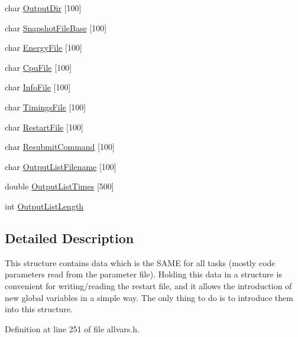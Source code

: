 \begin{DoxyCompactItemize}
\item 
char \hyperlink{structglobal__data__all__processes_aebda5d1b80cfb767b9668d7858c36bcc}{OutputDir} \mbox{[}100\mbox{]}
\item 
char \hyperlink{structglobal__data__all__processes_a4bcf5b5c31545691038015af9ae9acb3}{SnapshotFileBase} \mbox{[}100\mbox{]}
\item 
char \hyperlink{structglobal__data__all__processes_aa97394ab3a522c46b75f8b57a59ca0b5}{EnergyFile} \mbox{[}100\mbox{]}
\item 
char \hyperlink{structglobal__data__all__processes_ac2ba980c60460b89534ca8bba63cd679}{CpuFile} \mbox{[}100\mbox{]}
\item 
char \hyperlink{structglobal__data__all__processes_a3cbcdacb8b522288268993f0ce5b15ac}{InfoFile} \mbox{[}100\mbox{]}
\item 
char \hyperlink{structglobal__data__all__processes_ae0f7c691d211f8076374cc55271022e8}{TimingsFile} \mbox{[}100\mbox{]}
\item 
char \hyperlink{structglobal__data__all__processes_a67e197a37469217aa8ad32c42230b286}{RestartFile} \mbox{[}100\mbox{]}
\item 
char \hyperlink{structglobal__data__all__processes_a59f86964a3a1b03933a787cfc280951a}{ResubmitCommand} \mbox{[}100\mbox{]}
\item 
char \hyperlink{structglobal__data__all__processes_a063be13ecadec873ebaad1b3645a5323}{OutputListFilename} \mbox{[}100\mbox{]}
\item 
double \hyperlink{structglobal__data__all__processes_a7f3307450336a806e545661ba6c79ba5}{OutputListTimes} \mbox{[}500\mbox{]}
\item 
int \hyperlink{structglobal__data__all__processes_af0ada535a17b75233e0e0de6ff8fa448}{OutputListLength}
\end{DoxyCompactItemize}


\subsection{Detailed Description}
This structure contains data which is the SAME for all tasks (mostly code parameters read from the parameter file). Holding this data in a structure is convenient for writing/reading the restart file, and it allows the introduction of new global variables in a simple way. The only thing to do is to introduce them into this structure. 

Definition at line 251 of file allvars.h.



